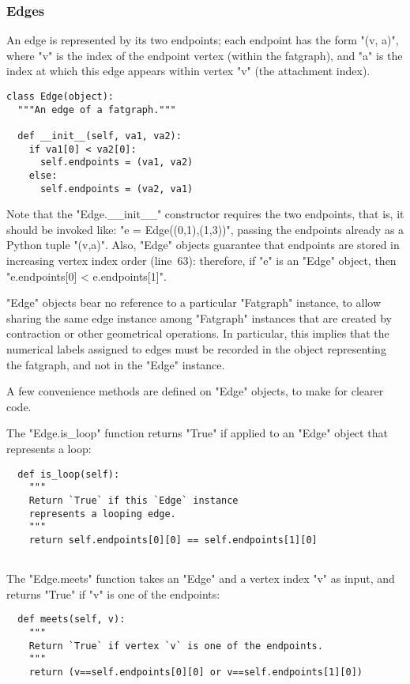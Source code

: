 \subsubsection{Edges}
\label{sec:edges}

An edge is represented by its two endpoints; each endpoint has the
form "(v, a)", where "v" is the index of the endpoint vertex
(within the fatgraph), and "a" is the index at which this edge
appears within vertex "v" (the attachment index).
\begin{lstlisting}
class Edge(object):
  """An edge of a fatgraph."""

  def __init__(self, va1, va2):
    if va1[0] < va2[0]:
      self.endpoints = (va1, va2)
    else:
      self.endpoints = (va2, va1)

\end{lstlisting}
Note that the "Edge.__init__" constructor requires the two
endpoints, that is, it should be invoked like: 
"e = Edge((0,1),(1,3))", passing the endpoints already as a Python tuple 
"(v,a)".  Also, "Edge" objects guarantee that endpoints are stored in
increasing vertex index order (line~63): therefore, if "e" is an "Edge"
object, then "e.endpoints[0] < e.endpoints[1]".

"Edge" objects bear no reference to a particular "Fatgraph" instance,
to allow sharing the same edge instance among "Fatgraph" instances that are
created by contraction or other geometrical operations.  In
particular, this implies that the numerical labels assigned to
edges must be recorded in the object representing the fatgraph, and
not in the "Edge" instance.

A few convenience methods are defined on "Edge" objects, to make for
clearer code.

The "Edge.is_loop" function returns "True" if applied to an
"Edge" object that represents a loop:
\begin{lstlisting}
  def is_loop(self):
    """
    Return `True` if this `Edge` instance 
    represents a looping edge.
    """
    return self.endpoints[0][0] == self.endpoints[1][0]
    
\end{lstlisting}

The "Edge.meets" function takes an "Edge" and a vertex index "v"
as input, and returns "True" if "v" is one of the endpoints:
\begin{lstlisting}
  def meets(self, v):
    """
    Return `True` if vertex `v` is one of the endpoints.
    """
    return (v==self.endpoints[0][0] or v==self.endpoints[1][0])

\end{lstlisting}

